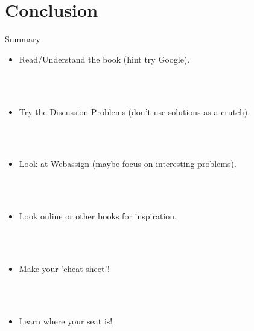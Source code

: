 \documentclass[t,10pt,mathserif,xcolor=pst,pdftex]{beamer}
\begin{document}
\section{Conclusion}

\begin{frame}{Summary}

\begin{itemize}
\item Read/Understand the book (hint try Google). 
\end{itemize}
\\~\

\begin{itemize}
\item Try the Discussion Problems (don't use solutions as a crutch). 
\end{itemize}
\\~\

\begin{itemize}
\item Look at Webassign (maybe focus on interesting problems). 
\end{itemize}
\\~\

\begin{itemize}
\item Look online or other books for inspiration. 
\end{itemize}
\\~\

\begin{itemize}
\item Make your 'cheat sheet'!
\end{itemize}
\\~\

\begin{itemize}
\item Learn where your seat is!
\end{itemize}

\end{frame}
\end{document}
